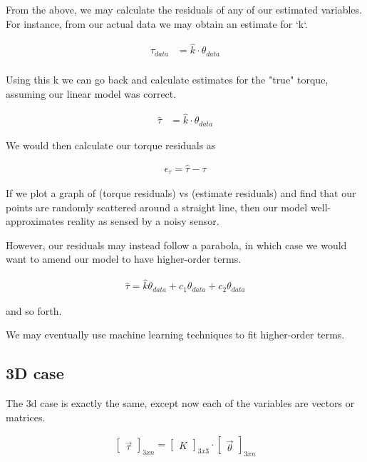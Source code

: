 \documentclass[12pt]{article}
\begin{document}
From the above, we may calculate the residuals of any of our estimated variables.
For instance, from our actual data we may obtain an estimate for `k`.

\begin{align}
 \tau_{data} &= \hat{k} \cdot \theta_{data} \\
\end{align}

Using this k we can go back and calculate estimates for the "true" torque, assuming our linear model was correct.

\begin{align}
 \hat{\tau} &= \hat{k} \cdot \theta_{data} 
\end{align}

We would then calculate our torque residuals as

\begin{align}
 \epsilon_{\tau} = \hat{\tau} - \tau 
\end{align}

If we plot a graph of (torque residuals) vs (estimate residuals) and find that our points are randomly scattered around a straight line, then our model well-approximates reality as sensed by a noisy sensor.

However, our residuals may instead follow a parabola, in which case we would want to amend our model
to have higher-order terms.

\begin{align}
 \hat{\tau} = \hat{k}\theta_{data} +c_1 \theta_{data} + c_2 \theta_{data}
\end{align}

and so forth. 

We may eventually use machine learning techniques to fit higher-order terms.

\subsection{3D case}
The 3d case is exactly the same, except now each of the variables are vectors or matrices. 

\begin{align}
    \begin{bmatrix} \vec{\tau} \end{bmatrix}_{3xn}  = \begin{bmatrix} K \end{bmatrix}_{3x3} \cdot \begin{bmatrix} \vec{\theta} \end{bmatrix}_{3xn} 
\end{align}
\end{document}
